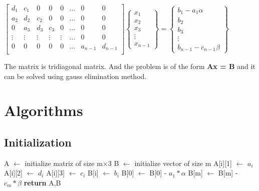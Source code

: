 \documentclass[12pt]{article}
\begin{document}
    \begin{center}$
        \begin{bmatrix}
            d_1 & c_1\ & 0 & 0 & 0 & ... & 0 & 0\\
            a_2 & d_2 & c_2 & 0 & 0 & ... & 0 & 0\\
            0 & a_3 & d_3 & c_3 & 0 & ... & 0 & 0 \\
            \vdots & \vdots & \vdots & \vdots & \vdots & \hdots & 0 & 0\\
            0 & 0 & 0 & 0 & 0 & \hdots & a_{n - 1} & d_{n - 1}\\
        \end{bmatrix}
        \begin{Bmatrix}
            x_1\\
            x_2\\
            x_3\\
            \vdots\\
            x_{n - 1}
        \end{Bmatrix}
        =
        \begin{Bmatrix}
            b_1 - a_1\alpha\\
            b_2\\
            b_3\\
            \vdots\\
            b_{n - 1} - c_{n - 1}\beta
        \end{Bmatrix}
        $
    \end{center}
    The matrix is tridiagonal matrix. And the problem is of the form \textbf{Ax = B} and it can be solved using gauss elimination method.

    \pagebreak
	\section{Algorithms}
	\subsection{Initialization}
	\begin{center}
		\begin{algorithmic}[1]
			\Statex {}
			\Statex {}
			\State A $\gets$ initialize matriz of size m$\times$3 
			\State B $\gets$ initialize vector of size m
			\State {}
			\State A[i][1] $\gets$ $a_i$
			\EndIf
			\State A[i][2] $\gets$ $d_i$
			\State A[i][3] $\gets$ $c_i$
			\EndIf
			\State B[i] $\gets$ $b_i$
			\EndFor
			\State B[0] $\gets$ B[0] - $a_1*\alpha$
			\State B[m] $\gets$ B[m] - $c_{m}*\beta$
            \State \textbf{return} A,B
			\EndProcedure
		\end{algorithmic}
	\end{center}
\end{document}
